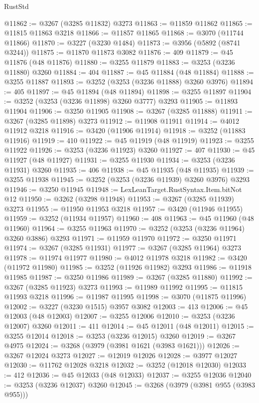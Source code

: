 \begin{lexlean}{RustStd}
\begin{coremodule}
{\begin{coremodule}
{{{{{{{{{{{{{{{{{{{{{{{{{{{{{{{{{{{{{{{@11862 := @3267 (@3285 @11832) @3273
@11863 := @11859 @11862
@11865 := @11815 @11863 @3218
@11866 := @11857 @11865
@11868 := @3070 (@11744 @11866)
@11870 := @3227 (@3230 @1484)
@11873 := @3956 (@5892 (@8741 @3244))
@11875 := @11870 @11873 @3082
@11876 := 409
@11879 := @45 @11876 (@48 @11876)
@11880 := @3255 @11879
@11883 := @3253 (@3236 @11880) @3260
@11884 := 404
@11887 := @45 @11884 (@48 @11884)
@11888 := @3255 @11887
@11893 := @3252 (@3253 (@3236 @11888) @3260 @3976)
@11894 := 405
@11897 := @45 @11894 (@48 @11894)
@11898 := @3255 @11897
@11904 := @3252 (@3253 (@3236 @11898) @3260 @3777) @3293
@11905 := @11893 @11904
@11906 := @3250 @11905
@11908 := @3267 (@3285 @11888)
@11911 := @3267 (@3285 @11898) @3273
@11912 := @11908 @11911
@11914 := @4012 @11912 @3218
@11916 := @3420 (@11906 @11914)
@11918 := @3252 (@11883 @11916)
@11919 := 410
@11922 := @45 @11919 (@48 @11919)
@11923 := @3255 @11922
@11926 := @3253 (@3236 @11923) @3260
@11927 := 407
@11930 := @45 @11927 (@48 @11927)
@11931 := @3255 @11930
@11934 := @3253 (@3236 @11931) @3260
@11935 := 406
@11938 := @45 @11935 (@48 @11935)
@11939 := @3255 @11938
@11945 := @3252 (@3253 (@3236 @11939) @3260 @3976) @3293
@11946 := @3250 @11945
@11948 := LexLeanTarget.RustSyntax.Item.bitNot @12
@11950 := @3262 (@3298 @11948)
@11953 := @3267 (@3285 @11939) @3273
@11955 := @11950 @11953 @3218
@11957 := @3420 (@11946 @11955)
@11959 := @3252 (@11934 @11957)
@11960 := 408
@11963 := @45 @11960 (@48 @11960)
@11964 := @3255 @11963
@11970 := @3252 (@3253 (@3236 @11964) @3260 @3886) @3293
@11971 := @11959 @11970
@11972 := @3250 @11971
@11974 := @3267 (@3285 @11931)
@11977 := @3267 (@3285 @11964) @3273
@11978 := @11974 @11977
@11980 := @4012 @11978 @3218
@11982 := @3420 (@11972 @11980)
@11985 := @3252 (@11926 @11982) @3293
@11986 := @11918 @11985
@11987 := @3250 @11986
@11989 := @3267 (@3285 @11880)
@11992 := @3267 (@3285 @11923) @3273
@11993 := @11989 @11992
@11995 := @11815 @11993 @3218
@11996 := @11987 @11995
@11998 := @3070 (@11875 @11996)
@12002 := @3227 (@3230 @1515) @3957 @3082
@12003 := 413
@12006 := @45 @12003 (@48 @12003)
@12007 := @3255 @12006
@12010 := @3253 (@3236 @12007) @3260
@12011 := 411
@12014 := @45 @12011 (@48 @12011)
@12015 := @3255 @12014
@12018 := @3253 (@3236 @12015) @3260
@12019 := @3267 @4975
@12024 := @3268 (@3979 (@3981 @1621 (@3983 @1621)))
@12026 := @3267 @12024 @3273
@12027 := @12019 @12026
@12028 := @3977 @12027
@12030 := @11762 @12028 @3218
@12032 := @3252 (@12018 @12030)
@12033 := 412
@12036 := @45 @12033 (@48 @12033)
@12037 := @3255 @12036
@12040 := @3253 (@3236 @12037) @3260
@12045 := @3268 (@3979 (@3981 @955 (@3983 @955)))
}}}}}}}}}}}}}}}}}}}}}}}}}}}}}}}}}}}}}}}
\end{coremodule}}
\end{coremodule}
\end{lexlean}
